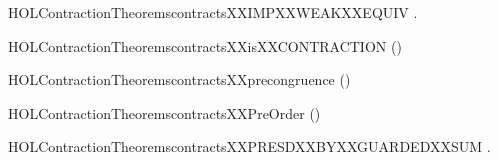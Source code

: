 \newcommand{\HOLContractionTheoremscontractsXXEPSYY}{\UseVerbatim{HOLContractionTheoremscontractsXXEPSYY}}
\begin{SaveVerbatim}{HOLContractionTheoremscontractsXXIMPXXWEAKXXEQUIV}
\HOLTokenTurnstile{} \HOLSymConst{\HOLTokenForall{}} .    \HOLSymConst{\HOLTokenImp{}}   
\end{SaveVerbatim}
\newcommand{\HOLContractionTheoremscontractsXXIMPXXWEAKXXEQUIV}{\UseVerbatim{HOLContractionTheoremscontractsXXIMPXXWEAKXXEQUIV}}
\begin{SaveVerbatim}{HOLContractionTheoremscontractsXXisXXCONTRACTION}
\HOLTokenTurnstile{}  ()
\end{SaveVerbatim}
\newcommand{\HOLContractionTheoremscontractsXXisXXCONTRACTION}{\UseVerbatim{HOLContractionTheoremscontractsXXisXXCONTRACTION}}
\begin{SaveVerbatim}{HOLContractionTheoremscontractsXXprecongruence}
\HOLTokenTurnstile{}  ()
\end{SaveVerbatim}
\newcommand{\HOLContractionTheoremscontractsXXprecongruence}{\UseVerbatim{HOLContractionTheoremscontractsXXprecongruence}}
\begin{SaveVerbatim}{HOLContractionTheoremscontractsXXPreOrder}
\HOLTokenTurnstile{}  ()
\end{SaveVerbatim}
\newcommand{\HOLContractionTheoremscontractsXXPreOrder}{\UseVerbatim{HOLContractionTheoremscontractsXXPreOrder}}
\begin{SaveVerbatim}{HOLContractionTheoremscontractsXXPRESDXXBYXXGUARDEDXXSUM}
\HOLTokenTurnstile{} \HOLSymConst{\HOLTokenForall{}}     .
          \HOLSymConst{\HOLTokenConj{}}    \HOLSymConst{\HOLTokenImp{}}
        \HOLSymConst{+}    \HOLSymConst{+} 
\end{SaveVerbatim}
